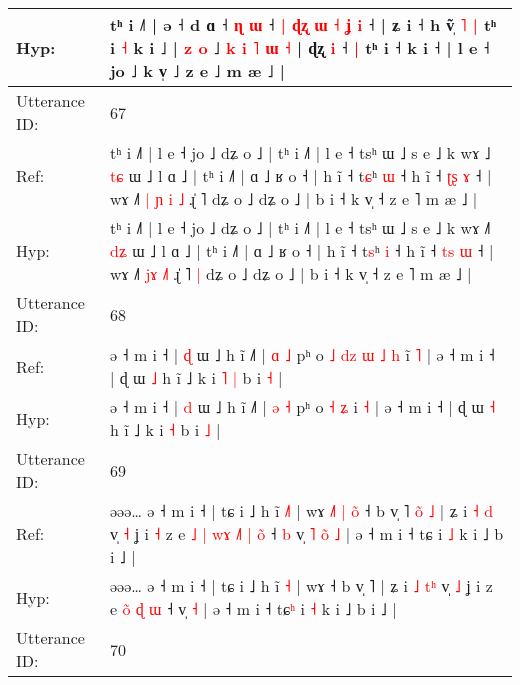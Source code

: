 \documentclass[10pt]{article}
\DeclareRobustCommand{\hl}[1]{{\textcolor{red}{#1}}}
\begin{document}
\begin{longtable}{ll}
 \\
Hyp: & tʰ i ˩˥ | ə ˧ d ɑ ˧ \hl{ɳ}\hl{ }\hl{ɯ} ˧ \hl{|} \hl{ɖ}\hl{ʐ} \hl{ɯ} \hl{˧} \hl{}\hl{ʝ} \hl{i} ˧ | \hl{}ʑ i ˧ h ṽ\hl{̩}\hl{ }\hl{˥} \hl{|} tʰ i \hl{˧} k i ˩ | \hl{z} \hl{}\hl{o} ˩\hl{}\hl{} \hl{k} \hl{i} \hl{˥} \hl{ɯ} \hl{˧} | ɖʐ \hl{i} ˧\hl{ }\hl{|} tʰ i ˧ k i ˧ | l e ˧ jo ˩ k v̩ ˩ z e ˩ m æ ˩ |
 \\
\midrule
Utterance ID: & 67 \\
Ref: & tʰ i ˩˥ | l e ˧ jo ˩ dʑ o ˩ | tʰ i ˩˥ | l e ˧ tsʰ ɯ ˩ s e ˩ k wɤ ˩\hl{} \hl{t}\hl{ɕ} ɯ ˩ l ɑ ˩ | tʰ i ˩˥ | ɑ ˩ ʁ o ˧ | h ĩ ˧ t\hl{ɕ}ʰ \hl{ɯ} ˧ h ĩ ˧ \hl{ʈ}\hl{ʂ} \hl{ɤ} ˧ | wɤ ˩˥ \hl{|}\hl{ }\hl{ɲ} \hl{i}\hl{ }\hl{˩} ɻ̍ ˥\hl{}\hl{} dʑ o ˩ dʑ o ˩ | b i ˧ k v̩ ˧ z e ˥ m æ ˩ |
 \\
Hyp: & tʰ i ˩˥ | l e ˧ jo ˩ dʑ o ˩ | tʰ i ˩˥ | l e ˧ tsʰ ɯ ˩ s e ˩ k wɤ ˩\hl{˥} \hl{d}\hl{ʑ} ɯ ˩ l ɑ ˩ | tʰ i ˩˥ | ɑ ˩ ʁ o ˧ | h ĩ ˧ t\hl{s}ʰ \hl{i} ˧ h ĩ ˧ \hl{t}\hl{s} \hl{ɯ} ˧ | wɤ ˩˥ \hl{}\hl{j}\hl{ɤ} \hl{}\hl{˩}\hl{˥} ɻ̍ ˥\hl{ }\hl{|} dʑ o ˩ dʑ o ˩ | b i ˧ k v̩ ˧ z e ˥ m æ ˩ |
 \\
\midrule
Utterance ID: & 68 \\
Ref: & ə ˧ m i ˧ | \hl{ɖ} ɯ ˩ h ĩ ˩˥ | \hl{ɑ} \hl{˩} pʰ o\hl{ }\hl{˩}\hl{ }\hl{d}\hl{z}\hl{ }\hl{ɯ} \hl{˩} \hl{h} i\hl{̃} \hl{˥} | ə ˧ m i ˧ | ɖ ɯ \hl{˩} h ĩ ˩ k i\hl{ }\hl{˥} \hl{|} b i \hl{˧} |
 \\
Hyp: & ə ˧ m i ˧ | \hl{d} ɯ ˩ h ĩ ˩˥ | \hl{ə} \hl{˧} pʰ o\hl{}\hl{}\hl{}\hl{}\hl{}\hl{}\hl{} \hl{˧} \hl{ʑ} i\hl{} \hl{˧} | ə ˧ m i ˧ | ɖ ɯ \hl{˧} h ĩ ˩ k i\hl{}\hl{} \hl{˧} b i \hl{˩} |
 \\
\midrule
Utterance ID: & 69 \\
Ref: & əəə… ə ˧ m i ˧ | tɕ i ˩ h ĩ \hl{˩}\hl{˥} | wɤ\hl{ }\hl{˩}\hl{˥}\hl{ }\hl{|}\hl{ }\hl{o}\hl{̃} ˧ b v̩ ˥\hl{ }\hl{o}\hl{̃}\hl{ }\hl{˩} | ʑ i \hl{˧} \hl{}\hl{d} v̩ \hl{˧} ʝ i\hl{ }\hl{˧} z e\hl{ }\hl{˩}\hl{ }\hl{|}\hl{ }\hl{w}\hl{ɤ} \hl{˩}\hl{˥} \hl{|} \hl{o}\hl{̃} ˧\hl{ }\hl{b} v̩\hl{ }\hl{˥}\hl{ }\hl{o}\hl{̃} \hl{˩} | ə ˧ m i ˧ tɕ\hl{} i \hl{˩} k i ˩ b i ˩ |
 \\
Hyp: & əəə… ə ˧ m i ˧ | tɕ i ˩ h ĩ \hl{}\hl{˧} | wɤ\hl{}\hl{}\hl{}\hl{}\hl{}\hl{}\hl{}\hl{} ˧ b v̩ ˥\hl{}\hl{}\hl{}\hl{}\hl{} | ʑ i \hl{˩} \hl{t}\hl{ʰ} v̩ \hl{˩} ʝ i\hl{}\hl{} z e\hl{}\hl{}\hl{}\hl{}\hl{}\hl{}\hl{} \hl{o}\hl{̃} \hl{ɖ} \hl{}\hl{ɯ} ˧\hl{}\hl{} v̩\hl{}\hl{}\hl{}\hl{}\hl{} \hl{˧} | ə ˧ m i ˧ tɕ\hl{ʰ} i \hl{˧} k i ˩ b i ˩ |
 \\
\midrule
Utterance ID: & 70 \\

\end{longtable}
\end{document}
